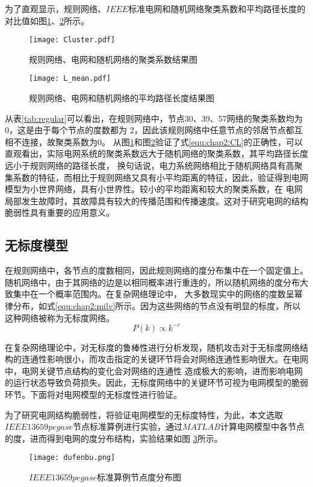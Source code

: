 为了直观显示，规则网络、$IEEE$标准电网和随机网络聚类系数和平均路径长度的对比值如图\ref{fig:Cluster}、\ref{fig:L_mean}所示。
\begin{figure}[H] %
    \centering
    \texttt{[image: Cluster.pdf]}
    \caption{规则网络、电网和随机网络的聚类系数结果图}
    \label{fig:Cluster}
\end{figure}

\begin{figure}[H] %
    \centering
    \texttt{[image: L\_mean.pdf]}
    \caption{规则网络、电网和随机网络的平均路径长度结果图}
    \label{fig:L_mean}
\end{figure}

从表\ref{tab:regular}可以看出，在规则网络中，节点30、39、57网络的聚类系数均为0，这是由于每个节点的度数都为 2，因此该规则网络中任意节点的邻居节点都互相不连接，故聚类系数为0。
从图\ref{fig:Cluster}和图\ref{fig:L_mean}验证了式\ref{equ:chap2:CL}的正确性，可以直观看出，实际电网系统的聚类系数远大于随机网络的聚类系数，其平均路径长度远小于规则网络的路径长度，
换句话说，电力系统网络相比于随机网络具有高聚集系数的特征，而相比于规则网络又具有小平均距离的特征，因此，验证得到电网模型为小世界网络，具有小世界性。较小的平均距离和较大的聚类系数，在
电网局部发生故障时，其故障具有较大的传播范围和传播速度。这对于研究电网的结构脆弱性具有重要的应用意义。

\subsection{无标度模型}
\label{sec:windModel}
在规则网络中，各节点的度数相同，因此规则网络的度分布集中在一个固定值上。随机网络中，由于其网络的边是以相同概率进行重连的，所以随机网络的度分布大致集中在一个概率范围内。在复杂网络理论中，
大多数现实中的网络的度数呈幂律分布，如式\ref{equ:chap2:milv}所示。因为这些网络的节点没有明显的标度，所以这种网络被称为无标度网络。
\begin{equation}
\label{equ:chap2:milv}
P(k) \propto k^{-r}
\end{equation}

在复杂网络理论中，对无标度的鲁棒性进行分析发现，随机攻击对于无标度网络结构的连通性影响很小，而攻击指定的关键环节将会对网络连通性影响很大。在电网中，电网关键节点结构的变化会对网络的连通性
造成极大的影响，进而影响电网的运行状态导致负荷损失。因此，无标度网络中的关键环节可视为电网模型的脆弱环节。下面将对电网模型的无标度性进行验证。

为了研究电网结构脆弱性，将验证电网模型的无标度特性，为此，本文选取$IEEE13659pegase$节点标准算例进行实验，通过$MATLAB$计算电网模型中各节点的度，进而得到电网的度分布结构，实验结果如图
\ref{fig:dufenbu}所示。
\begin{figure}[H] %
  \centering
  \texttt{[image: dufenbu.png]}
  \caption{$IEEE13659pegase$标准算例节点度分布图}
  \label{fig:dufenbu}
\end{figure}

